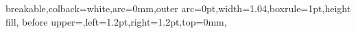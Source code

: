 \documentclass[UTF8,AutoFakeBold,AutoFakeSlant,zihao=-4]{ctexart}
\begin{document}




{
	breakable,colback=white,arc=0mm,outer arc=0pt,width=1.04\linewidth,boxrule=1pt,height fill,
	before upper={\parindent24bp},left=1.2pt,right=1.2pt,top=0mm,
}


\pagestyle{fancy}
\setcounter{page}{1}
\fancyhf{}

\fancyfoot[C]{\fontsize{9pt}{9pt}\selectfont{\thepage}}
\renewcommand{\headrulewidth}{0pt}
\renewcommand{\footrulewidth}{0pt}

\setlength{\parskip}{0em}
\renewcommand{\baselinestretch}{1.53}
\setlength{\parindent}{1.02cm}

\end{document}
